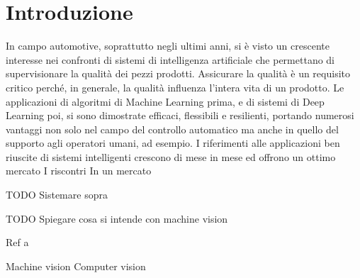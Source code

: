 
\chapter{Introduzione}

In campo automotive, soprattutto negli ultimi anni, si è visto un crescente interesse nei confronti di sistemi di intelligenza artificiale che permettano di supervisionare la qualità dei pezzi prodotti.
Assicurare la qualità è un requisito critico perché, in generale, la qualità influenza l'intera vita di un prodotto.
Le applicazioni di algoritmi di Machine Learning prima, e di sistemi di Deep Learning poi, si sono dimostrate efficaci, flessibili e resilienti, portando numerosi vantaggi non solo nel campo del controllo automatico ma anche in quello del supporto agli operatori umani, ad esempio.
I riferimenti alle applicazioni ben riuscite di sistemi intelligenti crescono di mese in mese ed offrono un ottimo mercato
I riscontri 
In un mercato 

TODO Sistemare sopra

TODO Spiegare cosa si intende con machine vision

Ref a

Machine vision
Computer vision

